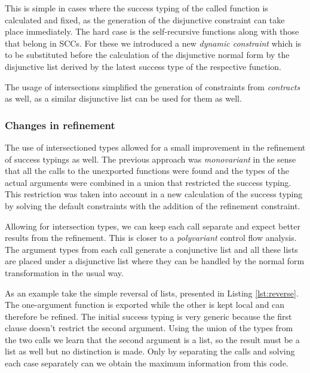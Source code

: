 This is simple in cases where the success typing of the called
function is calculated and fixed, as the generation of the disjunctive
constraint can take place immediately. The hard case is the
self-recursive functions along with those that belong in SCCs. For
these we introduced a new \emph{dynamic constraint} which is to be
substituted before the calculation of the disjunctive normal form by
the disjunctive list derived by the latest success type of the
respective function.

The usage of intersections simplified the generation of constraints
from \emph{contracts} as well, as a similar disjunctive list can be
used for them as well.

\subsubsection{Changes in refinement}
\label{sct:intersect_refinement}

The use of intersectioned types allowed for a small improvement in the
refinement of success typings as well. The previous approach was
\emph{monovariant} in the sense that all the calls to the unexported
functions were found and the types of the actual arguments were
combined in a union that restricted the success typing. This
restriction was taken into account in a new calculation of the success
typing by solving the default constraints with the addition of the
refinement constraint.

Allowing for intersection types, we can keep each call separate and
expect better results from the refinement. This is closer to a
\emph{polyvariant} control flow analysis. The argument types from each
call generate a conjunctive list and all these lists are placed under
a disjunctive list where they can be handled by the normal form
transformation in the usual way.

As an example take the simple reversal of lists, presented in Listing
\ref{lst:reverse}. The one-argument function is exported while the
other is kept local and can therefore be refined. The initial success
typing is very generic because the first clause doesn't restrict the
second argument. Using the union of the types from the two calls we
learn that the second argument is a list, so the result must be a list
as well but no distinction is made. Only by separating the calls and
solving each case separately can we obtain the maximum information
from this code.


